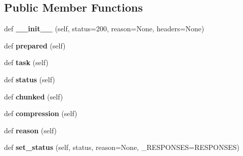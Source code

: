 \subsection*{Public Member Functions}
\begin{DoxyCompactItemize}
\item 
\mbox{\label{classaiohttp_1_1web__response_1_1_stream_response_a51d03f6e41dd037669e277039b4449eb}} 
def {\bfseries \+\_\+\+\_\+init\+\_\+\+\_\+} (self, status=200, reason=None, headers=None)
\item 
\mbox{\label{classaiohttp_1_1web__response_1_1_stream_response_a778f1452a7ca09a35a76273324a388f4}} 
def {\bfseries prepared} (self)
\item 
\mbox{\label{classaiohttp_1_1web__response_1_1_stream_response_a0dd2517af5ac08d140288bb48b844424}} 
def {\bfseries task} (self)
\item 
\mbox{\label{classaiohttp_1_1web__response_1_1_stream_response_a79be269aab1a570f3ba7addc51e9c5de}} 
def {\bfseries status} (self)
\item 
\mbox{\label{classaiohttp_1_1web__response_1_1_stream_response_ace5e29fc65df7f31f5ce42ea43d1534f}} 
def {\bfseries chunked} (self)
\item 
\mbox{\label{classaiohttp_1_1web__response_1_1_stream_response_aaf4de8085040959f40ba229364c6ab07}} 
def {\bfseries compression} (self)
\item 
\mbox{\label{classaiohttp_1_1web__response_1_1_stream_response_a02f0a9643830ad675d78ee74e46cbb73}} 
def {\bfseries reason} (self)
\item 
\mbox{\label{classaiohttp_1_1web__response_1_1_stream_response_a07d71929e27218ec57bd3b92873e34c7}} 
def {\bfseries set\+\_\+status} (self, status, reason=None, \+\_\+\+R\+E\+S\+P\+O\+N\+S\+ES=R\+E\+S\+P\+O\+N\+S\+ES)

\end{DoxyCompactItemize}
